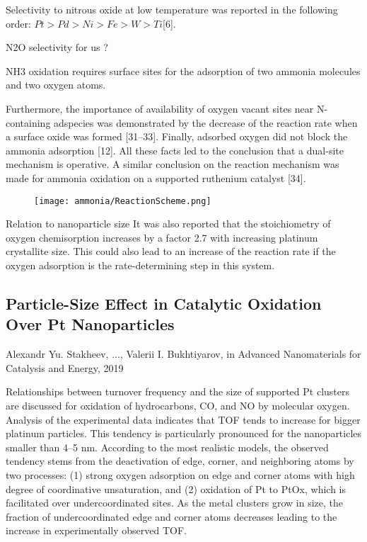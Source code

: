 Selectivity to nitrous oxide at low temperature was reported in the following order: $Pt > Pd > Ni > Fe > W > Ti $[6].

N2O selectivity for us ?

NH3 oxidation requires surface sites for the adsorption of two ammonia molecules and two oxygen atoms.

Furthermore, the importance of availability of oxygen vacant sites near N-containing adspecies was demonstrated by the decrease of the reaction rate when a surface oxide was formed [31–33].
Finally, adsorbed oxygen did not block the ammonia adsorption [12]. All these facts led to the conclusion that a dual-site mechanism is operative. A similar conclusion on the reaction mechanism was made for ammonia oxidation on a supported ruthenium catalyst [34].

\begin{figure}[ht]
    \centering
    \texttt{[image: ammonia/ReactionScheme.png]}
    \caption{\cite{Rebrov2002}}
    \label{fig:my_label}
\end{figure}

Relation to nanoparticle size
It was also reported that the stoichiometry of oxygen chemisorption increases by a factor 2.7 with increasing platinum crystallite size. This could also lead to an increase of the reaction rate if the oxygen adsorption is the rate-determining step in this system.

\subsection{Particle-Size Effect in Catalytic Oxidation Over Pt Nanoparticles}

Alexandr Yu. Stakheev, ..., Valerii I. Bukhtiyarov, in Advanced Nanomaterials for Catalysis and Energy, 2019

Relationships between turnover frequency and the size of supported Pt clusters are discussed for oxidation of hydrocarbons, CO, and NO by molecular oxygen. Analysis of the experimental data indicates that TOF tends to increase for bigger platinum particles. This tendency is particularly pronounced for the nanoparticles smaller than 4–5 nm. According to the most realistic models, the observed tendency stems from the deactivation of edge, corner, and neighboring atoms by two processes: (1) strong oxygen adsorption on edge and corner atoms with high degree of coordinative unsaturation, and (2) oxidation of Pt to PtOx, which is facilitated over undercoordinated sites. As the metal clusters grow in size, the fraction of undercoordinated edge and corner atoms decreases leading to the increase in experimentally observed TOF.


